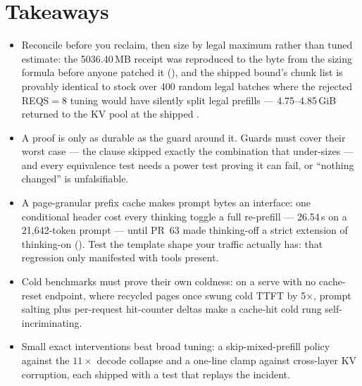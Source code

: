 \section*{Takeaways}

\begin{itemize}
  \item Reconcile before you reclaim, then size by legal maximum rather
    than tuned estimate: the 5036.40\,MB receipt was reproduced to the byte
    from the sizing formula before anyone patched it
    (), and the shipped bound's chunk list is
    provably identical to stock over 400 random legal batches where the
    rejected REQS${=}8$ tuning would have silently split legal prefills ---
    4.75--4.85\,GiB returned to the KV pool at the shipped
    .
  \item A proof is only as durable as the guard around it. Guards must
    cover their worst case --- the  clause skipped
    exactly the combination that under-sizes --- and every equivalence test
    needs a power test proving it can fail, or ``nothing changed'' is
    unfalsifiable.
  \item A page-granular prefix cache makes prompt bytes an interface: one
    conditional header cost every thinking toggle a full re-prefill ---
    26.54\,s on a 21{,}642-token prompt --- until PR~63 made thinking-off a
    strict extension of thinking-on (). Test the
    template shape your traffic actually has: that regression only
    manifested with tools present.
  \item Cold benchmarks must prove their own coldness: on a serve with no
    cache-reset endpoint, where recycled pages once swung cold TTFT by
    5$\times$, prompt salting plus per-request hit-counter deltas make a
    cache-hit cold rung self-incriminating.
  \item Small exact interventions beat broad tuning: a skip-mixed-prefill
    policy against the $11\times$ decode collapse and a one-line
     clamp against cross-layer KV corruption, each shipped
    with a test that replays the incident.
\end{itemize}

